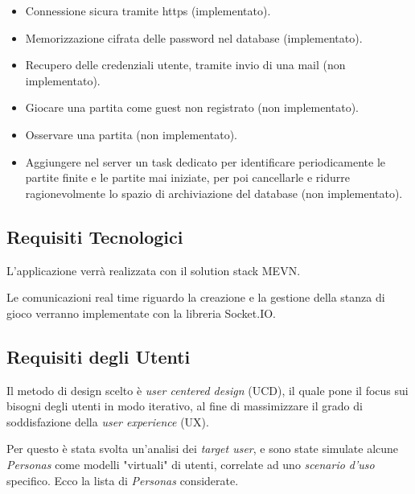 \begin{itemize}
\item
	Connessione sicura tramite https (implementato).
\item
	Memorizzazione cifrata delle password nel database (implementato).
\item
	Recupero delle credenziali utente, tramite invio di una mail (non implementato).
\item
	Giocare una partita come guest non registrato (non implementato).
\item
	Osservare una partita (non implementato).
\item
	Aggiungere nel server un task dedicato per identificare periodicamente le partite finite e le partite mai iniziate, per poi cancellarle e ridurre ragionevolmente lo spazio di archiviazione del database (non implementato).
\end{itemize}

\subsection{Requisiti Tecnologici}

L'applicazione verrà realizzata con il solution stack MEVN.

Le comunicazioni real time riguardo la creazione e la gestione della stanza di gioco verranno implementate con la libreria Socket.IO.

\subsection{Requisiti degli Utenti}

Il metodo di design scelto è \emph{user centered design} (UCD), il quale pone il focus sui bisogni degli utenti in modo iterativo, al fine di massimizzare il grado di soddisfazione della \emph{user experience} (UX).

Per questo è stata svolta un'analisi dei \emph{target user}, e sono state simulate alcune \emph{Personas} come modelli "virtuali" di utenti, correlate ad uno \emph{scenario d'uso} specifico. Ecco la lista di \emph{Personas} considerate.

